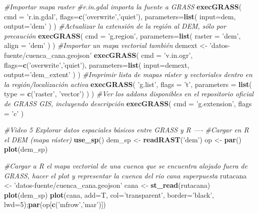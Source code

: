 \documentclass[11pt,]{article}
\newenvironment{Shaded}{\begin{snugshade}}{\end{snugshade}}
\newcommand{\KeywordTok}[1]{\textcolor[rgb]{0.13,0.29,0.53}{\textbf{#1}}}
\newcommand{\DataTypeTok}[1]{\textcolor[rgb]{0.13,0.29,0.53}{#1}}
\newcommand{\DecValTok}[1]{\textcolor[rgb]{0.00,0.00,0.81}{#1}}
\newcommand{\StringTok}[1]{\textcolor[rgb]{0.31,0.60,0.02}{#1}}
\newcommand{\CommentTok}[1]{\textcolor[rgb]{0.56,0.35,0.01}{\textit{#1}}}
\newcommand{\NormalTok}[1]{#1}
\begin{document}
\begin{Shaded}
\begin{Highlighting}[]
\CommentTok{#Importar mapa raster}
\CommentTok{#r.in.gdal importa la fuente a GRASS}
\KeywordTok{execGRASS}\NormalTok{(}
  \DataTypeTok{cmd =} \StringTok{'r.in.gdal'}\NormalTok{,}
  \DataTypeTok{flags=}\KeywordTok{c}\NormalTok{(}\StringTok{'overwrite'}\NormalTok{,}\StringTok{'quiet'}\NormalTok{),}
  \DataTypeTok{parameters=}\KeywordTok{list}\NormalTok{(}
    \DataTypeTok{input=}\NormalTok{dem,}
    \DataTypeTok{output=}\StringTok{'dem'}
\NormalTok{  )}
\NormalTok{)}
\CommentTok{#Actualizar la extensión de la región al DEM, sólo por precaución}
\KeywordTok{execGRASS}\NormalTok{(}
  \DataTypeTok{cmd =} \StringTok{'g.region'}\NormalTok{,}
  \DataTypeTok{parameters=}\KeywordTok{list}\NormalTok{(}
    \DataTypeTok{raster =} \StringTok{'dem'}\NormalTok{,}
    \DataTypeTok{align =} \StringTok{'dem'}
\NormalTok{  )}
\NormalTok{)}
\CommentTok{#Importar un mapa vectorial también}
\NormalTok{demext <-}\StringTok{ 'datos-fuente/cuenca_cana.geojson'}
\KeywordTok{execGRASS}\NormalTok{(}
  \DataTypeTok{cmd =} \StringTok{'v.in.ogr'}\NormalTok{,}
  \DataTypeTok{flags=}\KeywordTok{c}\NormalTok{(}\StringTok{'overwrite'}\NormalTok{,}\StringTok{'quiet'}\NormalTok{),}
  \DataTypeTok{parameters=}\KeywordTok{list}\NormalTok{(}
    \DataTypeTok{input=}\NormalTok{demext,}
    \DataTypeTok{output=}\StringTok{'dem_extent'}
\NormalTok{  )}
\NormalTok{)}
\CommentTok{#Imprimir lista de mapas ráster y vectoriales dentro en la región/localización activa}
\KeywordTok{execGRASS}\NormalTok{(}
  \StringTok{'g.list'}\NormalTok{,}
  \DataTypeTok{flags =} \StringTok{'t'}\NormalTok{,}
  \DataTypeTok{parameters =} \KeywordTok{list}\NormalTok{(}
    \DataTypeTok{type =} \KeywordTok{c}\NormalTok{(}\StringTok{'raster'}\NormalTok{, }\StringTok{'vector'}\NormalTok{)}
\NormalTok{  )}
\NormalTok{)}
\CommentTok{#Ver los addons disponibles en el repositorio oficial de GRASS GIS, incluyendo descripción}
\KeywordTok{execGRASS}\NormalTok{(}
  \DataTypeTok{cmd =} \StringTok{'g.extension'}\NormalTok{,}
  \DataTypeTok{flags =} \StringTok{'c'}
\NormalTok{)}

\CommentTok{#Video 5 Explorar datos espaciales básicos entre GRASS y R ----}
\CommentTok{#Cargar en R el DEM (mapa ráster)}
\KeywordTok{use_sp}\NormalTok{()}
\NormalTok{dem_sp <-}\StringTok{ }\KeywordTok{readRAST}\NormalTok{(}\StringTok{'dem'}\NormalTok{)}
\NormalTok{op <-}\StringTok{ }\KeywordTok{par}\NormalTok{()}
\KeywordTok{plot}\NormalTok{(dem_sp)}

\CommentTok{#Cargar a R el mapa vectorial de una cuenca que se encuentra alojado fuera de GRASS, hacer el plot y representar la cuenca del rio cana superpuesta}
\NormalTok{rutacana <-}\StringTok{ 'datos-fuente/cuenca_cana.geojson'}
\NormalTok{cana <-}\StringTok{ }\KeywordTok{st_read}\NormalTok{(rutacana)}
\KeywordTok{plot}\NormalTok{(dem_sp)}
\KeywordTok{plot}\NormalTok{(cana, }\DataTypeTok{add=}\NormalTok{T, }\DataTypeTok{col=}\StringTok{'transparent'}\NormalTok{, }\DataTypeTok{border=}\StringTok{'black'}\NormalTok{, }\DataTypeTok{lwd=}\DecValTok{5}\NormalTok{);}\KeywordTok{par}\NormalTok{(op[}\KeywordTok{c}\NormalTok{(}\StringTok{'mfrow'}\NormalTok{,}\StringTok{'mar'}\NormalTok{)])}


\end{Highlighting}
\end{Shaded}
\end{document}
